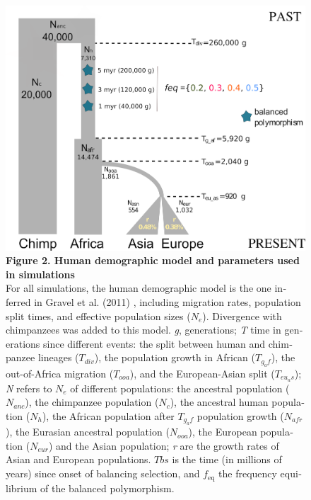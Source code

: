 \begin{refsection}
\begin{otherlanguage}{english}
\begin{figure}
\begin{center}
\includegraphics[]{chap2_folder/Figures/Fig2.tiff}
\caption*{\textbf{Figure 2. Human demographic model and parameters used in simulations}\\ 
For all simulations, the human demographic model is the one inferred in Gravel et al. (2011) \nocite{Gravel2011}, including migration rates, population split times, and effective population sizes ($N_{e}$). Divergence with chimpanzees was added to this model. \emph{g}, generations; \emph{T} time in generations since different events: the split between human and chimpanzee lineages ($T_{div}$), the population growth in African ($T_{g_af}$), the out-of-Africa migration ($T_{ooa}$), and the European-Asian split ($T_{eu_as}$); \emph{N} refers to $N_{e}$ of different populations: the ancestral population ($N_{anc}$), the chimpanzee population ($N_{c}$), the ancestral human population ($N_{h}$), the African population after $T_{g_af}$ population growth ($N_{afr}$), the Eurasian ancestral population ($N_{ooa}$), the European population ($N_{eur}$) and the Asian population; \emph{r} are the growth rates of Asian and European populations. $Tbs$ is the time (in millions of years) since onset of balancing selection, and $f_{\mathrm{eq}}$ the frequency equilibrium of the balanced polymorphism.
}
\end{center}
\end{figure}


\end{otherlanguage}
\end{refsection}
